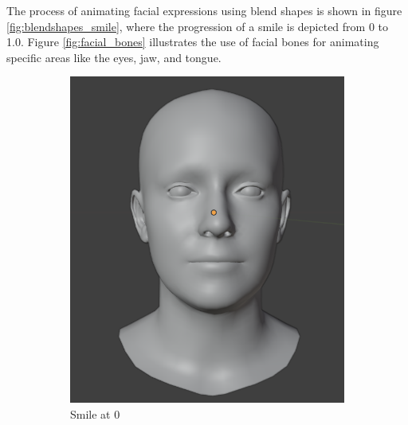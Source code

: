 \documentclass[../../main.tex]{subfiles}
\begin{document}
The process of animating facial expressions using blend shapes is shown in figure \ref{fig:blendshapes_smile}, where the progression of a smile is depicted from 0 to 1.0. Figure \ref{fig:facial_bones} illustrates the use of facial bones for animating specific areas like the eyes, jaw, and tongue.

\begin{figure}[h]
  \centering
  \begin{subfigure}{0.3\linewidth} 
      \includegraphics[width=\linewidth]{chapters/background_work/images/blendshapes_example/blendshapes_example_1.png} 
      \caption{Smile at 0} 
  \end{subfigure} 
  \hfill 
  \begin{subfigure}{0.3\linewidth} 

\end{subfigure}
\end{figure}
\end{document}

